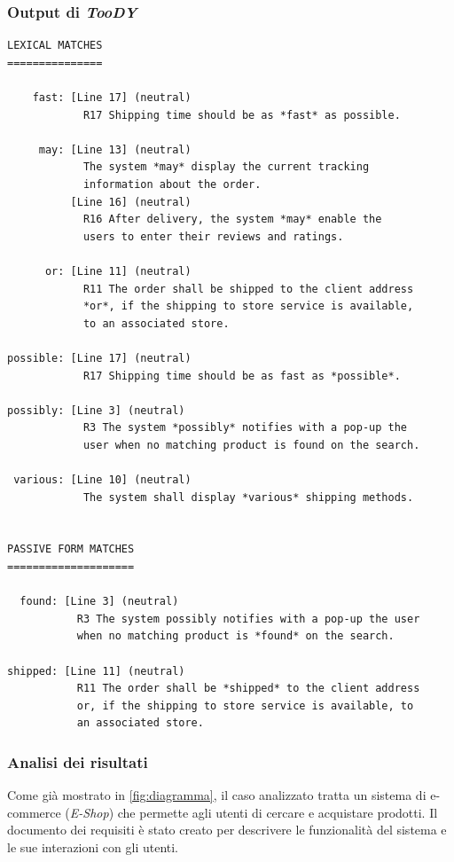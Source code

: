 \documentclass[12pt]{report}
\newcommand{\toody}{\textsl{TooDY}\xspace}
\begin{document}
\newpage
\subsubsection{Output di \toody}
\begin{lstlisting}
LEXICAL MATCHES
===============

    fast: [Line 17] (neutral)
            R17 Shipping time should be as *fast* as possible.

     may: [Line 13] (neutral)
            The system *may* display the current tracking
            information about the order.
          [Line 16] (neutral)
            R16 After delivery, the system *may* enable the
            users to enter their reviews and ratings.

      or: [Line 11] (neutral)
            R11 The order shall be shipped to the client address
            *or*, if the shipping to store service is available,
            to an associated store.

possible: [Line 17] (neutral)
            R17 Shipping time should be as fast as *possible*.

possibly: [Line 3] (neutral)
            R3 The system *possibly* notifies with a pop-up the
            user when no matching product is found on the search.

 various: [Line 10] (neutral)
            The system shall display *various* shipping methods.


PASSIVE FORM MATCHES
====================

  found: [Line 3] (neutral)
           R3 The system possibly notifies with a pop-up the user
           when no matching product is *found* on the search.

shipped: [Line 11] (neutral)
           R11 The order shall be *shipped* to the client address
           or, if the shipping to store service is available, to
           an associated store.
\end{lstlisting}


\newpage
\subsubsection{Analisi dei risultati}
Come già mostrato in \cref{fig:diagramma}, il caso analizzato tratta un sistema di e-commerce (\textit{E-Shop}) che permette agli utenti di cercare e acquistare prodotti. Il documento dei requisiti è stato creato per descrivere le funzionalità del sistema e le sue interazioni con gli utenti.
\end{document}
